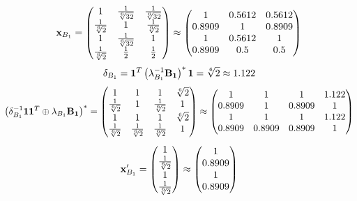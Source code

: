 \documentclass[10pt,a4paper]{article}
\begin{document}
	\[
		\bold{x}_{B_1} = 
		\begin{pmatrix}
			{1} {} & \frac{1} {\sqrt[6]{32}} & \frac{1} {\sqrt[6]{32}} \\
			\frac{1} {\sqrt[6]{2}} & {1} {} & \frac{1} {\sqrt[6]{2}} \\
			{1} {} & \frac{1} {\sqrt[6]{32}} & {1} {} \\
			\frac{1} {\sqrt[6]{2}} & \frac{1} {{2}} & \frac{1} {{2}} \\
		\end{pmatrix}
		\approx
		\begin{pmatrix}
			1        & 0.5612   & 0.5612   \\
			0.8909   & 1        & 0.8909   \\
			1        & 0.5612   & 1        \\
			0.8909   & 0.5      & 0.5      \\
		\end{pmatrix}
	\]
	\[
		\delta_{B_1} = \bold{1}^T \left(\lambda_{B_1}^{-1}\bold{B_1}\right)^* \bold{1} = {\sqrt[6]{2}} {}\approx 1.122
	\]
	\[
		\left(\delta_{B_1}^{-1}\bold{11}^T \oplus \lambda_{B_1}\bold{B_1}\right)^* = 
		\begin{pmatrix}
			{1} {} & {1} {} & {1} {} & {\sqrt[6]{2}} {} \\
			\frac{1} {\sqrt[6]{2}} & {1} {} & \frac{1} {\sqrt[6]{2}} & {1} {} \\
			{1} {} & {1} {} & {1} {} & {\sqrt[6]{2}} {} \\
			\frac{1} {\sqrt[6]{2}} & \frac{1} {\sqrt[6]{2}} & \frac{1} {\sqrt[6]{2}} & {1} {} \\
		\end{pmatrix}
		\approx
		\begin{pmatrix}
			1        & 1        & 1        & 1.122    \\
			0.8909   & 1        & 0.8909   & 1        \\
			1        & 1        & 1        & 1.122    \\
			0.8909   & 0.8909   & 0.8909   & 1        \\
		\end{pmatrix}
	\]
	\[
		\bold{x}'_{B_1} = 
		\begin{pmatrix}
			{1} {} \\
			\frac{1} {\sqrt[6]{2}} \\
			{1} {} \\
			\frac{1} {\sqrt[6]{2}} \\
		\end{pmatrix}
		\approx
		\begin{pmatrix}
			1        \\
			0.8909   \\
			1        \\
			0.8909   \\
		\end{pmatrix}
	\]
\end{document}
